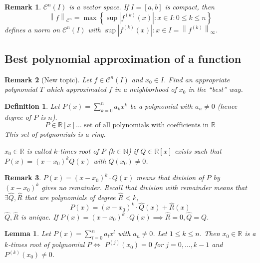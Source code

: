 \documentclass{article}
\newtheorem{definition}{Definition}  \numberwithin{definition}{section}
\newtheorem{lemma}{Lemma}  \numberwithin{lemma}{section}
\newtheorem{remark}{Remark}  \numberwithin{remark}{section}
\newcommand{\set}[1]{\left\{#1\right\}}
\newcommand{\norm}[1]{\left\|#1\right\|}
\newcommand{\card}[1]{\left|#1\right|}
\begin{document}
\begin{remark}
  $\mathcal C^n(I)$ is a vector space.
  If $I = [a,b]$ is compact, then
  \[ \norm{f}_{\mathcal C^n} = \max\set{\sup{\card{f^{(k)}(x)}: x \in I}: 0 \leq k \leq n} \]
  defines a norm on $\mathcal C^n(I)$ with $\sup{\card{f^{(k)}(x)}: x \in I} = {\norm{f^{(k)}}_{\infty}}$.
\end{remark}

\subsection{Best polynomial approximation of a function}

\begin{remark}[New topic]
  Let $f \in \mathcal C^n(I)$ and $x_0 \in I$. Find an appropriate polynomial $T$ which approximated $f$ in a neighborhood of $x_0$ in the \enquote{best} way.
\end{remark}

\begin{definition} %
  Let $P(x) = \sum_{k=0}^n a_k x^k$ be a polynomial with $a_n \neq 0$
  (hence degree of $P$ is $n$).
  \[ P \in \mathbb R[x] \dots \text{ set of all polynomials with coefficients in } \mathbb R \]
  This set of polynomials is a ring.

  $x_0 \in \mathbb R$ is called $k$-times root of $P$ ($k \in \mathbb N$) if $Q \in \mathbb R[x]$ exists such that
  $P(x) = (x - x_0)^k Q(x)$ with $Q(x_0) \neq 0$.
\end{definition}

\begin{remark}
  $P(x) = (x - x_0)^k \cdot Q(x)$ means that division of $P$ by $(x - x_0)^k$ gives no remainder.
  Recall that division with remainder means that $\exists \hat Q, \hat R$ that are polynomials of degree $\hat R < k$,
  \[ P(x) = (x - x_0)^k \cdot \hat Q(x) + \hat R(x) \]
  $\hat Q, \hat R$ is unique.
  If $P(x) = (x - x_0)^k \cdot Q(x) \implies \hat R = 0, \hat Q = Q$.
\end{remark}

\begin{lemma} %
  \label{lemma2-2}
  Let $P(x) = \sum_{l=0}^n a_l x^l$ with $a_n \neq 0$.
  Let $1 \leq k \leq n$. Then $x_0 \in \mathbb R$ is a $k$-times root of polynomial $P \iff$
  $P^{(j)}(x_0) = 0$ for $j = 0, \ldots, k-1$ and $P^{(k)}(x_0) \neq 0$.
\end{lemma}
\end{document}

